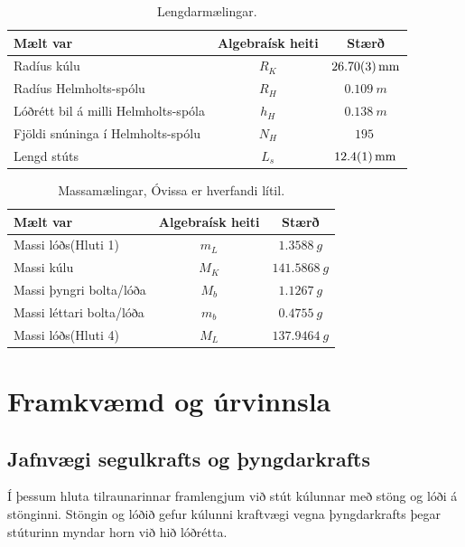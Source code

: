 \documentclass[11pt]{article}
\begin{document}
\begin{table}[H]
    \centering
        \caption{Lengdarmælingar.}
    \begin{tabular}{|l|c|c|}
    \hline
    Mælt var                &Algebraísk heiti   & Stærð \\
    \hline
    Radíus kúlu             &$R_K$              &$\SI{26.70\pm0.03}{mm}$\\
    Radíus Helmholts-spólu  &$R_H$              &$\SI{0.109}{m}$\\
    Lóðrétt bil á milli Helmholts-spóla&$h_H$   &$\SI{0.138}{m}$\\
    Fjöldi snúninga í Helmholts-spólu  & $N_H$  &$\SI{195}{}$\\
    Lengd stúts             &$L_s$              &$\SI{12.4\pm0.1}{mm}$\\
    \hline
    \end{tabular}

    \label{tab:lengdir}
\end{table}
\begin{table}[H]
\centering
    \caption{Massamælingar, Óvissa er hverfandi lítil.}
    \begin{tabular}{|l|c|c|}
    \hline
    Mælt var                &Algebraísk heiti   & Stærð \\
    \hline
    Massi lóðs(Hluti 1)     &$m_L$              &$\SI{1.3588}{g}$\\%
    Massi kúlu              &$M_K$              &$\SI{141.5868}{g}$\\
    Massi þyngri bolta/lóða &$M_b$              &$\SI{1.1267}{g}$\\
    Massi léttari bolta/lóða&$m_b$              &$\SI{0.4755}{g}$\\
    Massi lóðs(Hluti 4)     &$M_L$              &$\SI{137.9464}{g}$\\
    \hline
    \end{tabular}
    \label{tab:massar}
\end{table}

\section{Framkvæmd og úrvinnsla}
\subsection{Jafnvægi segulkrafts og þyngdarkrafts}
Í þessum hluta tilraunarinnar framlengjum við stút kúlunnar með stöng og lóði á stönginni. Stöngin og lóðið gefur kúlunni kraftvægi vegna þyngdarkrafts þegar stúturinn myndar horn við hið lóðrétta. 
\end{document}
